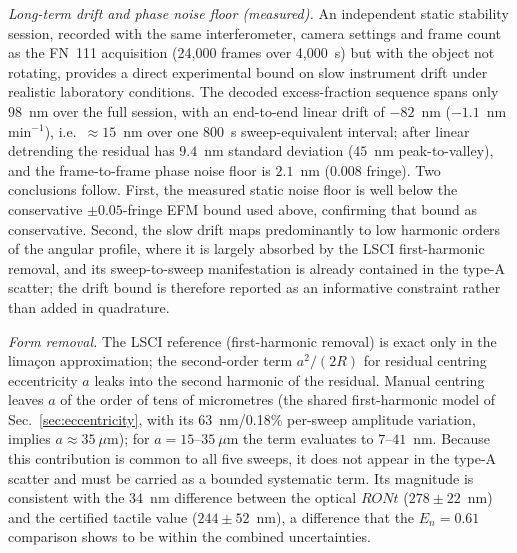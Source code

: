 \documentclass[review]{elsarticle}
\begin{document}
\emph{Long-term drift and phase noise floor (measured).} An independent static stability session, recorded with the same interferometer, camera settings and frame count as the FN~111 acquisition (24,000 frames over 4,000~s) but with the object not rotating, provides a direct experimental bound on slow instrument drift under realistic laboratory conditions. The decoded excess-fraction sequence spans only $98$~nm over the full session, with an end-to-end linear drift of $-82$~nm ($-1.1$~nm\,min$^{-1}$), i.e.\ $\approx15$~nm over one 800~s sweep-equivalent interval; after linear detrending the residual has $9.4$~nm standard deviation ($45$~nm peak-to-valley), and the frame-to-frame phase noise floor is $2.1$~nm ($0.008$ fringe). Two conclusions follow. First, the measured static noise floor is well below the conservative $\pm0.05$-fringe EFM bound used above, confirming that bound as conservative. Second, the slow drift maps predominantly to low harmonic orders of the angular profile, where it is largely absorbed by the LSCI first-harmonic removal, and its sweep-to-sweep manifestation is already contained in the type-A scatter; the drift bound is therefore reported as an informative constraint rather than added in quadrature.

\emph{Form removal.} The LSCI reference (first-harmonic removal) is exact only in the lima\c{c}on approximation; the second-order term $a^2/(2R)$ for residual centring eccentricity $a$ leaks into the second harmonic of the residual. Manual centring leaves $a$ of the order of tens of micrometres (the shared first-harmonic model of Sec.~\ref{sec:eccentricity}, with its 63~nm/0.18\% per-sweep amplitude variation, implies $a\approx35~\mu$m); for $a=15$--$35~\mu$m the term evaluates to $7$--$41$~nm. Because this contribution is common to all five sweeps, it does not appear in the type-A scatter and must be carried as a bounded systematic term. Its magnitude is consistent with the $34$~nm difference between the optical $RONt$ ($278\pm22$~nm) and the certified tactile value ($244\pm52$~nm), a difference that the $E_n=0.61$ comparison shows to be within the combined uncertainties.
\end{document}
